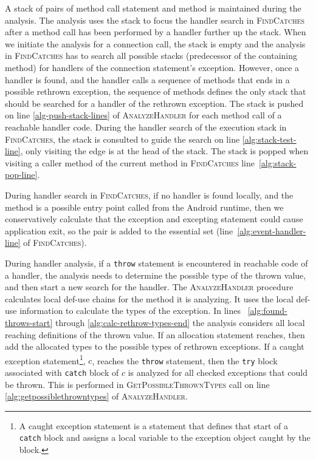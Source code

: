 A stack of pairs of method call statement and method is maintained
during the analysis.  The analysis uses the stack to focus the handler
search in \textsc{FindCatches} after a method call has been performed
by a handler further up the stack. When we initiate the analysis for
a connection call, the stack is empty and the analysis in
\textsc{FindCatches} has to search all possible stacks (predecessor of
the containing method) for handlers of the connection statement's
exception.  However, once a handler is found, and the handler calls a
sequence of methods that ends in a possible rethrown exception, the
sequence of methods defines the only stack that should be searched for
a handler of the rethrown exception.  The stack is pushed on line
\ref{alg-push-stack-lines} of \textsc{AnalyzeHandler} for each method
call of a reachable handler code.  During the handler search of the
execution stack in \textsc{FindCatches}, the
stack is consulted to guide the search on line
\ref{alg:stack-test-line}, only visiting the edge is at the head of
the stack. The stack is popped when visiting a caller method of the
current method in \textsc{FindCatches} line~\ref{alg:stack-pop-line}.

During handler search in \textsc{FindCatches}, if no handler is found
locally, and the method is a possible entry point called from the
Android runtime, then we conservatively calculate that the exception
and excepting statement could cause application exit, so the pair is
added to the essential set (line~\ref{alg:event-handler-line} of
\textsc{FindCatches}). 

During handler analysis, if a \lstinline!throw! statement is
encountered in reachable code of a handler, the analysis needs to
determine the possible type of the thrown value, and then start a new
search for the handler.  The \textsc{AnalyzeHandler} procedure
calculates local def-use chains for the method it is analyzing.  It
uses the local def-use information to calculate the types of the
exception.  In lines ~\ref{alg:found-throws-start} through
\ref{alg:calc-rethrow-types-end} the analysis considers all local
reaching definitions of the thrown value.  If an allocation statement
reaches, then add the allocated types to the possible types of
rethrown exceptions. If a caught exception statement\footnote{A caught
  exception statement is a statement that defines that start of a
  \lstinline!catch! block and assigns a local variable to the
  exception object caught by the block.}, $c$, reaches the
\lstinline!throw! statement, then the \lstinline!try! block associated
with \lstinline!catch! block of $c$ is analyzed for all checked
exceptions that could be thrown.  This is performed in
\textsc{GetPossibleThrownTypes} call on line
\ref{alg:getpossiblethrowntypes} of \textsc{AnalyzeHandler}.

